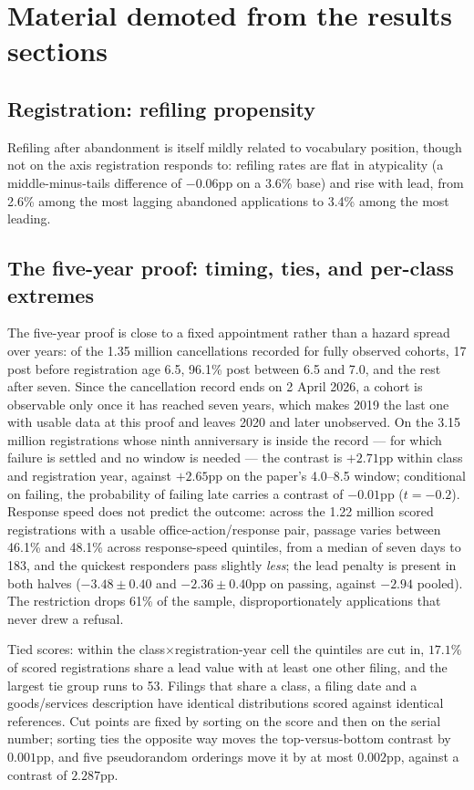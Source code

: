 \section{Material demoted from the results sections}\label{supp:demoted}

\subsection{Registration: refiling propensity}

Refiling after abandonment is itself mildly related to vocabulary
position, though not on the axis registration responds to: refiling rates
are flat in atypicality (a middle-minus-tails difference of $-0.06$pp on
a 3.6\% base) and rise with lead, from 2.6\% among the most lagging
abandoned applications to 3.4\% among the most leading.

\subsection{The five-year proof: timing, ties, and per-class extremes}

The five-year proof is close to a fixed appointment rather than a hazard
spread over years: of the 1.35 million cancellations recorded for fully
observed cohorts, 17 post before registration age 6.5, 96.1\% post
between 6.5 and 7.0, and the rest after seven. Since the cancellation
record ends on 2 April 2026, a cohort is observable only once it has
reached seven years, which makes 2019 the last one with usable data at
this proof and leaves 2020 and later unobserved. On the 3.15 million
registrations whose ninth anniversary is inside the record --- for which
failure is settled and no window is needed --- the contrast is $+2.71$pp
within class and registration year, against $+2.65$pp on the paper's
4.0--8.5 window; conditional on failing, the probability of failing late
carries a contrast of $-0.01$pp ($t = -0.2$). Response speed does not
predict the outcome: across the 1.22 million scored registrations with a
usable office-action/response pair, passage varies between 46.1\% and
48.1\% across response-speed quintiles, from a median of seven days to
183, and the quickest responders pass slightly \emph{less}; the lead
penalty is present in both halves ($-3.48 \pm 0.40$ and
$-2.36 \pm 0.40$pp on passing, against $-2.94$ pooled). The restriction
drops 61\% of the sample, disproportionately applications that never drew
a refusal.

Tied scores: within the class$\times$registration-year cell the quintiles
are cut in, $17.1$\% of scored registrations share a lead value with at
least one other filing, and the largest tie group runs to 53. Filings
that share a class, a filing date and a goods/services description have
identical distributions scored against identical references. Cut points
are fixed by sorting on the score and then on the serial number; sorting
ties the opposite way moves the top-versus-bottom contrast by $0.001$pp,
and five pseudorandom orderings move it by at most $0.002$pp, against a
contrast of $2.287$pp.

